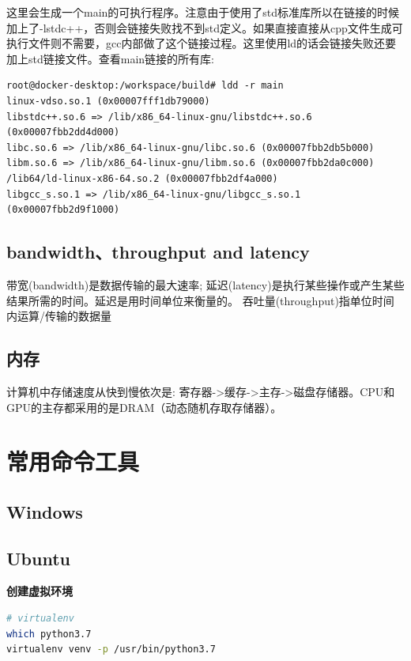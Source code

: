 \documentclass[12pt]{book}
\begin{document}
这里会生成一个main的可执行程序。注意由于使用了std标准库所以在链接的时候加上了-lstdc++，否则会链接失败找不到std定义。如果直接直接从cpp文件生成可执行文件则不需要，gcc内部做了这个链接过程。这里使用ld的话会链接失败还要加上std链接文件。查看main链接的所有库:
\begin{lstlisting}
root@docker-desktop:/workspace/build# ldd -r main
linux-vdso.so.1 (0x00007fff1db79000)
libstdc++.so.6 => /lib/x86_64-linux-gnu/libstdc++.so.6 (0x00007fbb2dd4d000)
libc.so.6 => /lib/x86_64-linux-gnu/libc.so.6 (0x00007fbb2db5b000)
libm.so.6 => /lib/x86_64-linux-gnu/libm.so.6 (0x00007fbb2da0c000)
/lib64/ld-linux-x86-64.so.2 (0x00007fbb2df4a000)
libgcc_s.so.1 => /lib/x86_64-linux-gnu/libgcc_s.so.1 (0x00007fbb2d9f1000)
\end{lstlisting}

\subsection{bandwidth、throughput and latency}
带宽(bandwidth)是数据传输的最大速率;
延迟(latency)是执行某些操作或产生某些结果所需的时间。延迟是用时间单位来衡量的。
吞吐量(throughput)指单位时间内运算/传输的数据量

\subsection{内存}
计算机中存储速度从快到慢依次是: 寄存器->缓存->主存->磁盘存储器。CPU和GPU的主存都采用的是DRAM（动态随机存取存储器）。

\section{常用命令工具}
\subsection{Windows}
\subsection{Ubuntu}
\textbf{创建虚拟环境}
\begin{lstlisting}[language=bash]
# virtualenv
which python3.7
virtualenv venv -p /usr/bin/python3.7
\end{lstlisting}

\newpage

\fancyhead{}
\end{document}
